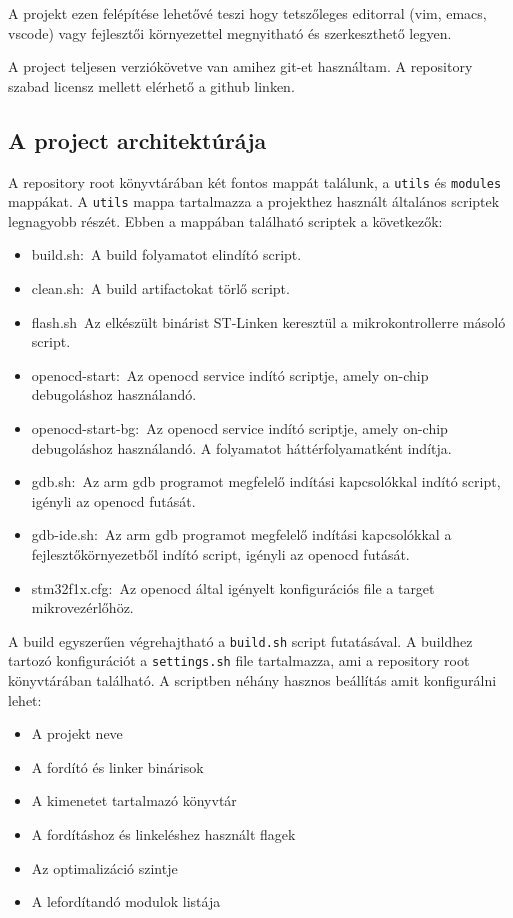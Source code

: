 A projekt ezen felépítése lehetővé teszi hogy tetszőleges editorral (vim, emacs,
vscode) vagy fejlesztői környezettel megnyitható és szerkeszthető legyen.

A project teljesen verziókövetve van amihez git-et használtam. A repository
szabad licensz mellett elérhető a github linken\cite{RpirobotGitrepo}. 

\subsection{A project architektúrája}

A repository root könyvtárában két fontos mappát találunk, a \verb|utils| és
\verb|modules| mappákat. A \verb|utils| mappa tartalmazza a projekthez használt
általános scriptek legnagyobb részét. Ebben a mappában található scriptek a
következők:

\begin{itemize}
  \setlength\itemsep{0em}
\item{build.sh:~A build folyamatot elindító script.}
\item{clean.sh:~A build artifactokat törlő script.}
\item{flash.sh~Az elkészült binárist ST-Linken keresztül a mikrokontrollerre
  másoló script.}
\item{openocd-start:~Az openocd service indító scriptje, amely on-chip
  debugoláshoz használandó.}
\item{openocd-start-bg:~Az openocd service indító scriptje, amely on-chip
  debugoláshoz használandó. A folyamatot háttérfolyamatként indítja.}
\item{gdb.sh:~Az arm gdb programot megfelelő indítási kapcsolókkal indító script,
  igényli az openocd futását.}
\item{gdb-ide.sh:~Az arm gdb programot megfelelő indítási kapcsolókkal a
  fejlesztőkörnyezetből indító script, igényli az openocd futását.}
\item{stm32f1x.cfg:~Az openocd által igényelt konfigurációs file a target
  mikrovezérlőhöz.}
\end{itemize}

A build egyszerűen végrehajtható a \verb|build.sh| script futatásával. A buildhez
tartozó konfigurációt a \verb|settings.sh| file tartalmazza, ami a repository
root könyvtárában található. A scriptben néhány hasznos beállítás amit
konfigurálni lehet:

\begin{itemize}
  \setlength\itemsep{0em}
\item{A projekt neve}
\item{A fordító és linker binárisok}
\item{A kimenetet tartalmazó könyvtár}
\item{A fordításhoz és linkeléshez használt flagek}
\item{Az optimalizáció szintje}
\item{A lefordítandó modulok listája}
\end{itemize}

